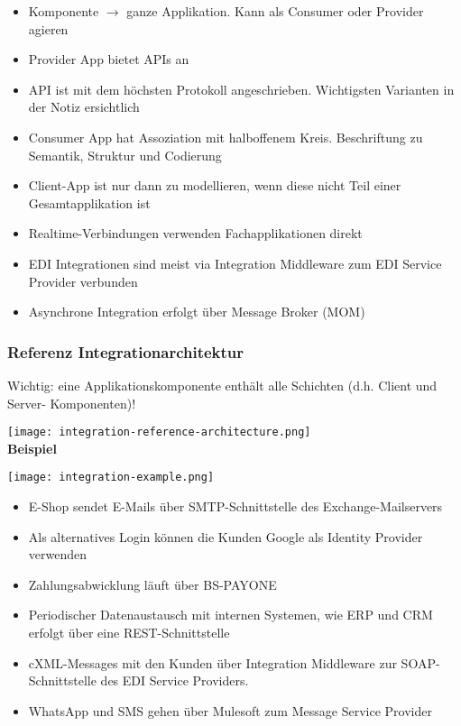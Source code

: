 \begin{itemize}
    \item Komponente $\rightarrow$ ganze Applikation. Kann als Consumer oder Provider agieren
    \item Provider App bietet APIs an
    \item API ist mit dem höchsten Protokoll angeschrieben. Wichtigsten Varianten in der Notiz ersichtlich
    \item Consumer App hat Assoziation mit halboffenem Kreis. Beschriftung zu Semantik, Struktur und Codierung
    \item Client-App ist nur dann zu modellieren, wenn diese nicht Teil einer Gesamtapplikation ist
    \item Realtime-Verbindungen verwenden Fachapplikationen direkt
    \item EDI Integrationen sind meist via Integration Middleware zum EDI Service Provider verbunden
    \item Asynchrone Integration erfolgt über Message Broker (MOM)
\end{itemize}

\subsubsection{Referenz Integrationarchitektur}

Wichtig: eine Applikationskomponente enthält alle Schichten (d.h. Client und Server-
Komponenten)!

\texttt{[image: integration-reference-architecture.png]} \\

\textbf{Beispiel}

\texttt{[image: integration-example.png]}

\begin{itemize}
    \item E-Shop sendet E-Mails über SMTP-Schnittstelle des Exchange-Mailservers
    \item Als alternatives Login können die Kunden Google als Identity Provider verwenden
    \item Zahlungsabwicklung läuft über BS-PAYONE
    \item Periodischer Datenaustausch mit internen Systemen, wie ERP und CRM erfolgt über eine REST-Schnittstelle
    \item cXML-Messages mit den Kunden über Integration Middleware zur SOAP-Schnittstelle des EDI Service Providers.
    \item WhatsApp und SMS gehen über Mulesoft zum Message Service Provider
\end{itemize}

